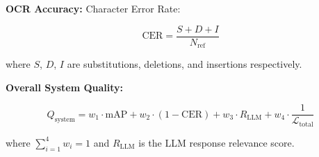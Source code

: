 \textbf{OCR Accuracy:} Character Error Rate:

\begin{equation}
\text{CER} = \frac{S + D + I}{N_{\text{ref}}}
\end{equation}

where $S$, $D$, $I$ are substitutions, deletions, and insertions respectively.

\textbf{Overall System Quality:}

\begin{equation}
Q_{\text{system}} = w_1 \cdot \text{mAP} + w_2 \cdot (1 - \text{CER}) + w_3 \cdot R_{\text{LLM}} + w_4 \cdot \frac{1}{\mathcal{L}_{\text{total}}}
\end{equation}

where $\sum_{i=1}^{4} w_i = 1$ and $R_{\text{LLM}}$ is the LLM response relevance score.
